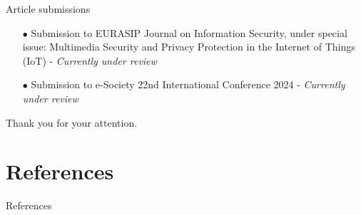 \documentclass[xcolor={svgnames},compress,aspectratio=169]{beamer}
\begin{document}

\begin{frame}{Article submissions}
    \begin{itemize}
        \item[$\bullet$]
        Submission to EURASIP Journal on Information Security, under special issue: Multimedia
        Security and Privacy Protection in the Internet of Things (IoT) - \textit{Currently under review}
        \item[$\bullet$]
        Submission to e-Society 22nd International Conference 2024 - \textit{Currently under review}
    \end{itemize}
\end{frame}


\begin{frame}
    \begin{center}
        {\large Thank you for your attention.}
    \end{center}
\end{frame}

\section*{References}

\begin{frame}[allowframebreaks]{References}
    
    {\footnotesize }
\end{frame}
\end{document}
